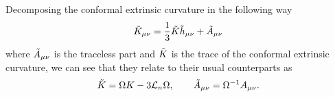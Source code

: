Decomposing the conformal extrinsic curvature in the following way
\begin{equation}
    \Tilde{K}_{\mu\nu}=\frac{1}{3}\Tilde{K}\Tilde{h}_{\mu\nu}+\Tilde{A}_{\mu\nu}
\end{equation}
where $\Tilde{A}_{\mu\nu}$ is the traceless part and $\Tilde{K}$ is the trace of the conformal extrinsic curvature, we can see that they relate to their usual counterparts as
\begin{equation}
    \Tilde{K}=\Omega K-3\mathcal{L}_n\Omega, \qquad \Tilde{A}_{\mu\nu}=\Omega^{-1}A_{\mu\nu}.
\end{equation}



